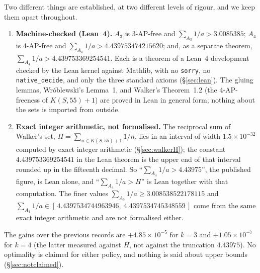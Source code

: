 \documentclass[11pt,a4paper]{article}
\theoremstyle{definition}
\theoremstyle{remark}
\newcommand{\code}[1]{\texttt{#1}}
\begin{document}
Two different things are established, at two different levels of rigour, and we keep them apart throughout.

\begin{enumerate}
\item \textbf{Machine-checked (Lean~4).} $A_3$ is 3-AP-free and $\sum_{A_3} 1/a > 3.0085385$; $A_4$ is 4-AP-free and $\sum_{A_4} 1/a > 4.439753474215620$; and, as a separate theorem, $\sum_{A_4} 1/a > 4.439753369254541$. Each is a theorem of a Lean~4 development checked by the Lean kernel against Mathlib, with no \code{sorry}, no \code{native\_decide}, and only the three standard axioms (\S\ref{sec:lean}). The gluing lemmas, Wr\'oblewski's Lemma~1, and Walker's Theorem~1.2 (the 4-AP-freeness of $K(S,55)+1$) are proved in Lean in general form; nothing about the sets is imported from outside.
\item \textbf{Exact integer arithmetic, not formalised.} The reciprocal sum of Walker's set, $H = \sum_{n \in K(S,55)+1} 1/n$, lies in an interval of width $1.5 \times 10^{-32}$ computed by exact integer arithmetic (\S\ref{sec:walkerH}); the constant $4.439753369254541$ in the Lean theorem is the upper end of that interval rounded up in the fifteenth decimal. So ``$\sum_{A_4} 1/a > 4.43975$'', the published figure, is Lean alone, and ``$\sum_{A_4} 1/a > H$'' is Lean together with that computation. The finer values $\sum_{A_3} 1/a \ge 3.008538522178115$ and $\sum_{A_4} 1/a \in [\,4.4397534744963946,\ 4.4397534745348559\,]$ come from the same exact integer arithmetic and are not formalised either.
\end{enumerate}

The gains over the previous records are $+4.85 \times 10^{-5}$ for $k=3$ and $+1.05 \times 10^{-7}$ for $k=4$ (the latter measured against $H$, not against the truncation $4.43975$). No optimality is claimed for either policy, and nothing is said about upper bounds (\S\ref{sec:notclaimed}).
\end{document}

